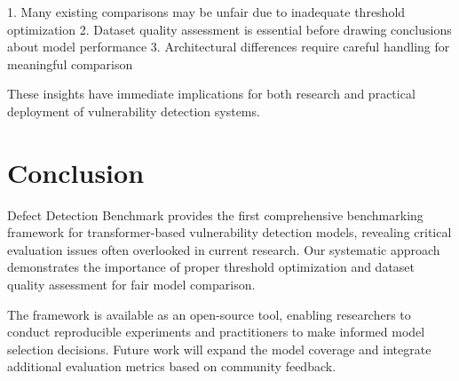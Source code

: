\documentclass[letterpaper]{article}
\begin{document}
1. Many existing comparisons may be unfair due to inadequate threshold optimization
2. Dataset quality assessment is essential before drawing conclusions about model performance
3. Architectural differences require careful handling for meaningful comparison

These insights have immediate implications for both research and practical deployment of vulnerability detection systems.

\section{Conclusion}

Defect Detection Benchmark provides the first comprehensive benchmarking framework for transformer-based vulnerability detection models, revealing critical evaluation issues often overlooked in current research. Our systematic approach demonstrates the importance of proper threshold optimization and dataset quality assessment for fair model comparison.

The framework is available as an open-source tool, enabling researchers to conduct reproducible experiments and practitioners to make informed model selection decisions. Future work will expand the model coverage and integrate additional evaluation metrics based on community feedback.



\end{document}

